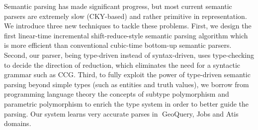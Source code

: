 Semantic parsing has made significant progress, but most current semantic parsers are extremely slow (CKY-based) and rather primitive in representation. We introduce three new techniques to tackle these problems. First, we design the first linear-time incremental shift-reduce-style semantic parsing algorithm which is more efficient than conventional cubic-time bottom-up semantic parsers. Second, our parser, being type-driven instead of syntax-driven, uses type-checking to decide the direction of reduction, which eliminates the need for a syntactic grammar such as CCG. Third, to fully exploit the power of type-driven semantic parsing beyond simple types (such as entities and truth values), we borrow from programming language theory the concepts of subtype polymorphism and parametric polymorphism to enrich the type system in order to better guide the parsing. Our system learns very accurate parses in GeoQuery, Jobs and Atis domains.
